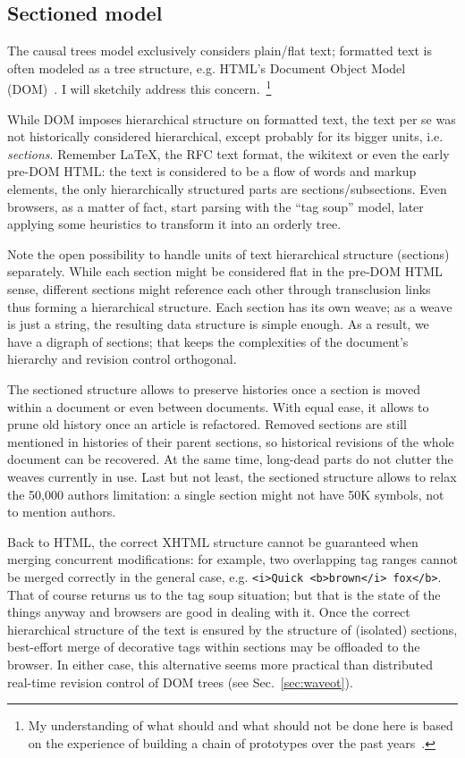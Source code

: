 \documentclass{acm_proc_article-sp}
\begin{document}
\subsection{Sectioned model}	\label{sec:sec}

The causal trees model exclusively considers plain/flat text; formatted text is often modeled as a tree structure, e.g. HTML's Document Object Model (DOM)~\cite{dom}.
I will sketchily address this concern.~\footnote{My understanding of what should and what should not be done here is based on the experience of building a chain of prototypes over the past years~\cite{www06,csr07,wikisym08}.} 

While DOM imposes hierarchical structure on formatted text, the text per se was not historically considered hierarchical, except probably for its bigger units, i.e. \emph{sections}. 
Remember LaTeX, the RFC text format, the wikitext or even the early pre-DOM HTML: the text is considered to be a flow of words and markup elements, the only hierarchically structured parts are sections/subsections.
Even browsers, as a matter of fact, start parsing with the ``tag soup'' model, later applying some heuristics to transform it into an orderly tree. 

Note the open possibility to handle units of text hierarchical structure (sections) separately.
While each section might be considered flat in the pre-DOM HTML sense, different sections might reference each other through transclusion links thus forming a hierarchical structure.
Each section has its own weave; as a weave is just a string, the resulting data structure is simple enough.
As a result, we have a digraph of sections; that keeps the complexities of the document's hierarchy and revision control orthogonal. 

The sectioned structure allows to preserve histories once a section is moved within a document or even between documents.
With equal ease, it allows to prune old history once an article is refactored.
Removed sections are still mentioned in histories of their parent sections, so historical revisions of the whole document can be recovered. At the same time, long-dead parts do not clutter the weaves currently in use.
Last but not least, the sectioned structure allows to relax the 50,000 authors limitation: a single section might not have 50K symbols, not to mention authors.

Back to HTML, the correct XHTML structure cannot be guaranteed when merging concurrent modifications: for example, two overlapping tag ranges cannot be merged correctly in the general case, e.g. 
{\small \verb+<i>Quick <b>brown</i> fox</b>+. }\\
That of course returns us to the tag soup situation; but that is the state of the things anyway and  browsers are good in dealing with it. 
Once the correct hierarchical structure of the text is ensured by the structure of (isolated) sections, best-effort merge of decorative tags within sections may be offloaded to the browser.
In either case, this alternative seems more practical than distributed real-time revision control of DOM trees (see Sec.~\ref{sec:waveot}).
\end{document}
